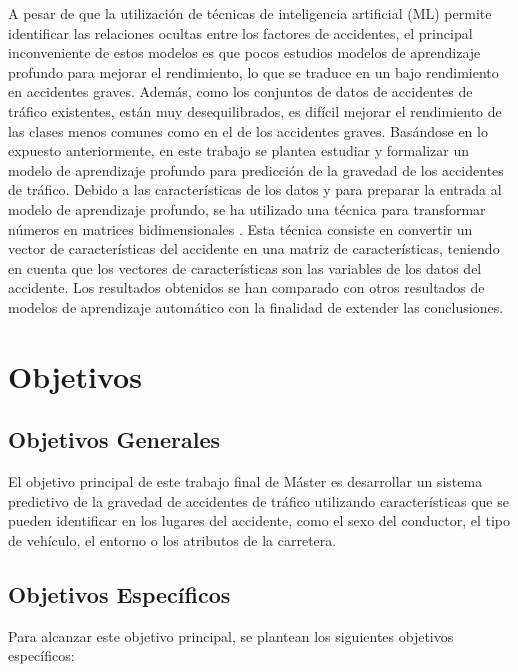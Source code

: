 	A pesar de que la utilización de técnicas de inteligencia artiﬁcial (ML) permite identiﬁcar las relaciones ocultas entre los factores de accidentes, el principal inconveniente de estos modelos es que pocos estudios modelos de aprendizaje profundo para mejorar el rendimiento, lo que se traduce en un bajo rendimiento en  accidentes graves. Además, como los conjuntos de datos de accidentes de tráﬁco existentes, están muy desequilibrados, es difícil mejorar el rendimiento de las clases menos comunes como en el de los accidentes graves. Basándose en lo expuesto anteriormente, en este trabajo se plantea estudiar y formalizar un modelo de aprendizaje profundo para predicción de la gravedad de los accidentes de tráﬁco. Debido a las características de los datos y para preparar la entrada al modelo de aprendizaje profundo, se ha utilizado una técnica para transformar números en matrices bidimensionales \cite{TASPCNN}. Esta técnica consiste en convertir un vector de características del accidente en una matriz de características, teniendo en cuenta que los vectores de características son las variables de los datos del accidente. Los resultados obtenidos se han comparado con otros resultados de modelos de aprendizaje automático con la finalidad de extender las conclusiones.

\section {Objetivos}

	\subsection{Objetivos Generales}

		El objetivo principal de este trabajo final de Máster es desarrollar un sistema predictivo de la gravedad de accidentes de tráfico utilizando características que se pueden identificar en los lugares del accidente, como el sexo del conductor, el tipo de vehículo, el entorno o los atributos de la carretera.

	\subsection{Objetivos Específicos}

		Para alcanzar este objetivo principal, se plantean los siguientes objetivos específicos:

